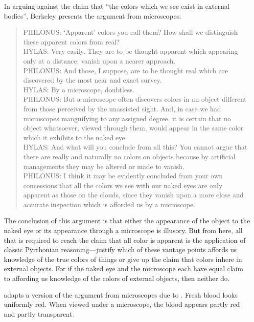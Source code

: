 \documentclass[12pt]{article}
\begin{document}
In arguing against the claim that ``the colors which we see exist in external bodies'', Berkeley presents the argument from microscopes:
\begin{quote}
	PHILONUS: `Apparent' colors you call them? How shall we distinguish these apparent colors from real?\\
	HYLAS: Very easily. They are to be thought apparent which appearing only at a distance, vanish upon a nearer approach.\\
	PHILONUS: And those, I suppose, are to be thought real which are discovered by the most near and exact survey.\\
	HYLAS: By a microscope, doubtless.\\
	PHILONUS: But a microscope often discovers colors in an object different from those perceived by the unassisted sight. And, in case we had microscopes mangnifying to any assigned degree, it is certain that no object whatsoever, viewed through them, would appear in the same color which it exhibits to the naked eye.\\
	HYLAS: And what will you conclude from all this? You cannot argue that there are really and naturally no colors on objects because by artificial managements they may be altered or made to vanish.\\
	PHILONUS: I think it may be evidently concluded from your own concessions that all the colors we see with our naked eyes are only apparent as those on the clouds, since they vanish upon a more close and accurate inspection which is afforded us by a microscope.
\end{quote}
The conclusion of this argument is that either the appearance of the object to the naked eye or its appearance through a microscope is illusory. But from here, all that is required to reach the claim that all color is apparent is the application of classic Pyrrhonian reasoning---justify which of these vantage points affords us knowledge of the true colors of things or give up the claim that colors inhere in external objects. For if the naked eye and the microscope each have equal claim to affording us knowledge of the colors of external objects, then neither do.

\citet{Hilbert:1987jq} adapts a version of the argument from microscopes due to \citet{Marc-Wogau:1968kx}. Fresh blood looks uniformly red. When viewed under a microscope, the blood appears partly red and partly transparent. 



 
 
\end{document}
